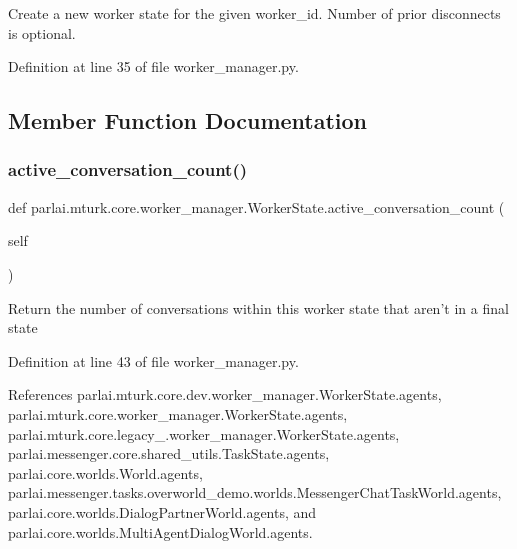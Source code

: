\begin{DoxyVerb}Create a new worker state for the given worker_id. Number of
prior disconnects is optional.
\end{DoxyVerb}
 

Definition at line 35 of file worker\+\_\+manager.\+py.



\subsection{Member Function Documentation}
\mbox{\label{classparlai_1_1mturk_1_1core_1_1worker__manager_1_1WorkerState_adf199dbdc37d1a6a00365b31632f30d0}} 
\subsubsection{\texorpdfstring{active\+\_\+conversation\+\_\+count()}{active\_conversation\_count()}}
{\footnotesize\ttfamily def parlai.\+mturk.\+core.\+worker\+\_\+manager.\+Worker\+State.\+active\+\_\+conversation\+\_\+count (\begin{DoxyParamCaption}\item[{}]{self }\end{DoxyParamCaption})}

\begin{DoxyVerb}Return the number of conversations within this worker state
that aren't in a final state
\end{DoxyVerb}
 

Definition at line 43 of file worker\+\_\+manager.\+py.



References parlai.\+mturk.\+core.\+dev.\+worker\+\_\+manager.\+Worker\+State.\+agents, parlai.\+mturk.\+core.\+worker\+\_\+manager.\+Worker\+State.\+agents, parlai.\+mturk.\+core.\+legacy\+\_.\+worker\+\_\+manager.\+Worker\+State.\+agents, parlai.\+messenger.\+core.\+shared\+\_\+utils.\+Task\+State.\+agents, parlai.\+core.\+worlds.\+World.\+agents, parlai.\+messenger.\+tasks.\+overworld\+\_\+demo.\+worlds.\+Messenger\+Chat\+Task\+World.\+agents, parlai.\+core.\+worlds.\+Dialog\+Partner\+World.\+agents, and parlai.\+core.\+worlds.\+Multi\+Agent\+Dialog\+World.\+agents.

